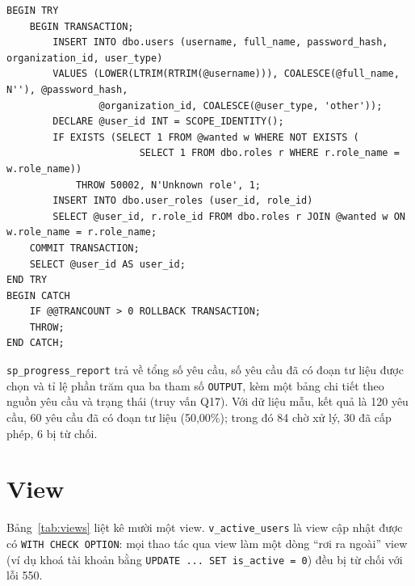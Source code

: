 \begin{lstlisting}[caption={Giao dịch trong sp\_create\_user (rút gọn)}, label={lst:create_user}]
BEGIN TRY
    BEGIN TRANSACTION;
        INSERT INTO dbo.users (username, full_name, password_hash, organization_id, user_type)
        VALUES (LOWER(LTRIM(RTRIM(@username))), COALESCE(@full_name, N''), @password_hash,
                @organization_id, COALESCE(@user_type, 'other'));
        DECLARE @user_id INT = SCOPE_IDENTITY();
        IF EXISTS (SELECT 1 FROM @wanted w WHERE NOT EXISTS (
                       SELECT 1 FROM dbo.roles r WHERE r.role_name = w.role_name))
            THROW 50002, N'Unknown role', 1;
        INSERT INTO dbo.user_roles (user_id, role_id)
        SELECT @user_id, r.role_id FROM dbo.roles r JOIN @wanted w ON w.role_name = r.role_name;
    COMMIT TRANSACTION;
    SELECT @user_id AS user_id;
END TRY
BEGIN CATCH
    IF @@TRANCOUNT > 0 ROLLBACK TRANSACTION;
    THROW;
END CATCH;
\end{lstlisting}

\texttt{sp\_progress\_report} trả về tổng số yêu cầu, số yêu cầu đã có đoạn tư liệu được
chọn và tỉ lệ phần trăm qua ba tham số \texttt{OUTPUT}, kèm một bảng chi tiết theo nguồn yêu
cầu và trạng thái (truy vấn Q17). Với dữ liệu mẫu, kết quả là 120 yêu cầu, 60 yêu cầu đã có
đoạn tư liệu (50,00\%); trong đó 84 chờ xử lý, 30 đã cấp phép, 6 bị từ chối.

\section{View}

Bảng~\ref{tab:views} liệt kê mười một view. \texttt{v\_active\_users} là view cập nhật được
có \texttt{WITH CHECK OPTION}: mọi thao tác qua view làm một dòng ``rơi ra ngoài'' view
(ví dụ khoá tài khoản bằng \texttt{UPDATE ... SET is\_active = 0}) đều bị từ chối với lỗi 550.

